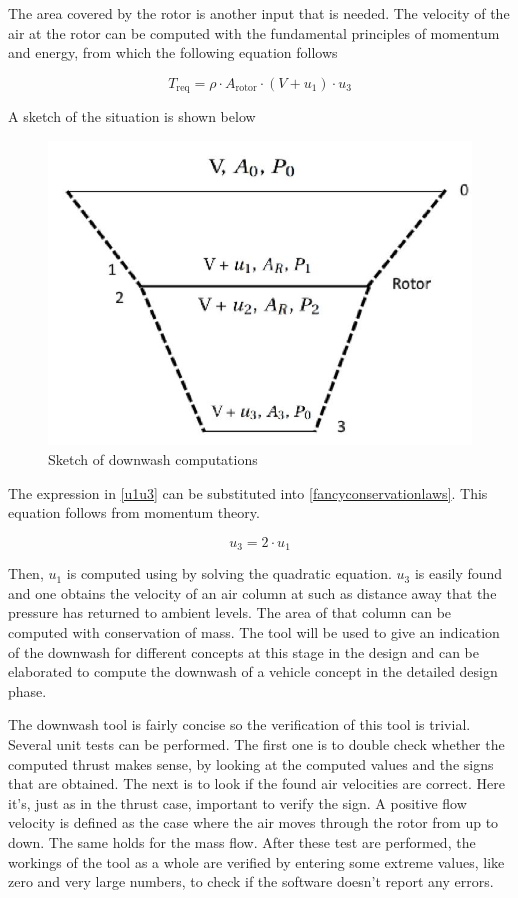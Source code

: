 The area covered by the rotor is another input that is needed. The velocity of the air at the rotor can be computed with the fundamental principles of momentum and energy, from which the following equation follows 

\begin{equation}
\label{fancyconservationlaws}
    T_\text{req} = \rho\cdot A_\text{rotor}\cdot(V + u_1)\cdot u_3 
\end{equation}

A sketch of the situation is shown below

\begin{figure}[H]
    \centering
    \includegraphics[width=0.5\linewidth]{Figures/downwashsketch.JPG}
    \captionsetup{justification=centering}
    \caption{Sketch of downwash computations}
    \label{downwashsketch}
\end{figure}

The expression in \autoref{u1u3} can be substituted into \autoref{fancyconservationlaws}. This equation follows from momentum theory. 

\begin{equation}
\label{u1u3}
    u_3 = 2\cdot u_1
\end{equation}

Then, $u_1$ is computed using by solving the quadratic equation. $u_3$ is easily found and one obtains the velocity of an air column at such as distance away that the pressure has returned to ambient levels. The area of that column can be computed with conservation of mass. The tool will be used to give an indication of the downwash for different concepts at this stage in the design and can be elaborated to compute the downwash of a vehicle concept in the detailed design phase. 

The downwash tool is fairly concise so the verification of this tool is trivial. Several unit tests can be performed. The first one is to double check whether the computed thrust makes sense, by looking at the computed values and the signs that are obtained. The next is to look if the found air velocities are correct. Here it's, just as in the thrust case, important to verify the sign. A positive flow velocity is defined as the case where the air moves through the rotor from up to down. The same holds for the mass flow. After these test are performed, the workings of the tool as a whole are verified by entering some extreme values, like zero and very large numbers, to check if the software doesn't report any errors.   


